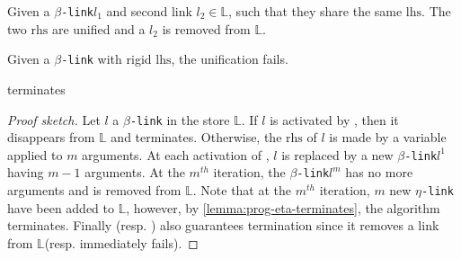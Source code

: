 \documentclass[sigconf,natbib=false,review]{acmart}
\newcommand{\linkMacro}[1]{\ensuremath{#1}\texttt{-link}\xspace}
\newcommand{\linkbeta}{\linkMacro{\beta}}
\newcommand{\linketa} {\linkMacro{\eta}}
\newcommand{\lhs}{\ensuremath{\mathrm{lhs}}\xspace}
\newcommand{\rhs}{\ensuremath{\mathrm{rhs}}\xspace}
\newcommand{\linkStore}{\ensuremath{\mathbb{L}}\xspace}
\begin{document}
\begin{definition}[\progBetaDedup]
  Given a \linkbeta $l_1$ and second link $l_2 \in\linkStore$, such that they
  share the same \lhs. The two \rhs are unified and a $l_2$ is
  removed from \linkStore.
  \label{def:progBetaDedup}
\end{definition}

\begin{definition}[\progBetaLH]
  Given a \linkbeta with rigid \lhs, the unification fails.
  \label{def:progBetaLH}
\end{definition}

\begin{lemma}
   terminates
\end{lemma}

\begin{proof}[Proof sketch]
  Let $l$ a \linkbeta in the store \linkStore. If $l$ is activated by
  \progBetaRH, then it disappears from \linkStore and 
  terminates. Otherwise, the \rhs of $l$ is made by a variable applied to $m$
  arguments. At each activation of \progBetaLL, $l$ is replaced by a new
  \linkbeta $l^1$ having $m-1$ arguments. At the $m^{th}$ iteration, the
  \linkbeta $l^m$ has no more arguments and is removed from \linkStore.
  Note that at the $m^{th}$ iteration, $m$ new \linketa have been added to
  \linkStore, however, by \cref{lemma:prog-eta-terminates}, the algorithm
  terminates. Finally \progBetaDedup (resp. \progBetaLH) also guarantees termination since 
  it removes a link from \linkStore (resp. immediately fails).  

\end{proof}
\end{document}
